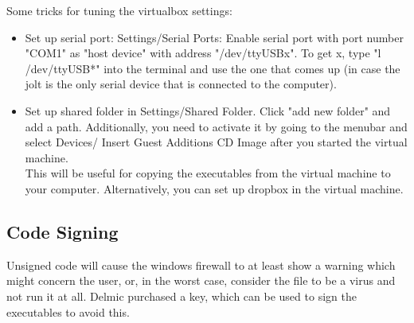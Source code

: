 \documentclass[]{article}
\begin{document}
Some tricks for tuning the virtualbox settings:
\begin{itemize}
	\item Set up serial port: Settings/Serial Ports: Enable serial port with port number "COM1" as "host device" with address "/dev/ttyUSBx". To get x, type "l /dev/ttyUSB*" into the terminal and use the one that comes up (in case the jolt is the only serial device that is connected to the computer).
	\item Set up shared folder in Settings/Shared Folder. Click "add new folder" and add a path. Additionally, you need to activate it by going to the menubar and select Devices/ Insert Guest Additions CD Image after you started the virtual machine.\\
	This will be useful for copying the executables from the virtual machine to your computer. Alternatively, you can set up dropbox in the virtual machine.
\end{itemize}

\subsection{Code Signing}
Unsigned code will cause the windows firewall to at least show a warning which might concern the user, or, in the worst case, consider the file to be a virus and not run it at all. Delmic purchased a key, which can be used to sign the executables to avoid this.
\end{document}
